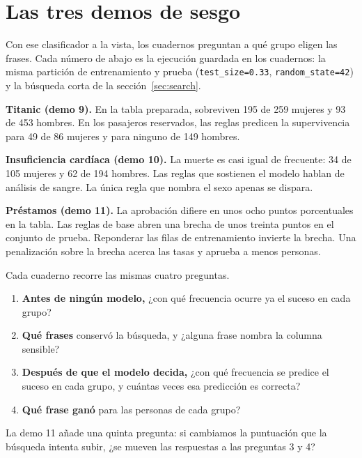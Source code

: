 \documentclass[11pt]{article}
\newcommand{\fn}[1]{\texttt{\small #1}}
\begin{document}
\section{Las tres demos de sesgo}
\label{sec:picture}

Con ese clasificador a la vista, los cuadernos preguntan a qué grupo eligen las frases. Cada número de abajo es la ejecución guardada en los cuadernos: la misma partición de entrenamiento y prueba (\fn{test\_size=0.33}, \fn{random\_state=42}) y la búsqueda corta de la sección~\ref{sec:search}.

\begin{lesson}
\textbf{Titanic (demo 9).} En la tabla preparada, sobreviven 195 de 259 mujeres y 93 de 453 hombres. En los pasajeros reservados, las reglas predicen la supervivencia para 49 de 86 mujeres y para ninguno de 149 hombres.

\textbf{Insuficiencia cardíaca (demo 10).} La muerte es casi igual de frecuente: 34 de 105 mujeres y 62 de 194 hombres. Las reglas que sostienen el modelo hablan de análisis de sangre. La única regla que nombra el sexo apenas se dispara.

\textbf{Préstamos (demo 11).} La aprobación difiere en unos ocho puntos porcentuales en la tabla. Las reglas de base abren una brecha de unos treinta puntos en el conjunto de prueba. Reponderar las filas de entrenamiento invierte la brecha. Una penalización sobre la brecha acerca las tasas y aprueba a menos personas.
\end{lesson}

Cada cuaderno recorre las mismas cuatro preguntas.

\begin{enumerate}
  \item \textbf{Antes de ningún modelo,} ¿con qué frecuencia ocurre ya el suceso en cada grupo?
  \item \textbf{Qué frases} conservó la búsqueda, y ¿alguna frase nombra la columna sensible?
  \item \textbf{Después de que el modelo decida,} ¿con qué frecuencia se predice el suceso en cada grupo, y cuántas veces esa predicción es correcta?
  \item \textbf{Qué frase ganó} para las personas de cada grupo?
\end{enumerate}

La demo 11 añade una quinta pregunta: si cambiamos la puntuación que la búsqueda intenta subir, ¿se mueven las respuestas a las preguntas 3 y 4?
\end{document}
